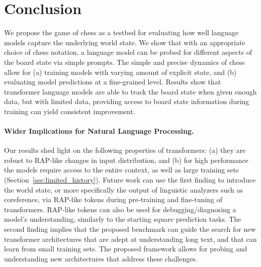 \section{Conclusion}
We propose the game of chess as a testbed for evaluating how well language models capture the underlying world state. 
We show that with an appropriate choice of chess notation, a language model can be probed for different aspects of the board state via simple prompts.
The simple and precise dynamics of chess allow for (a) training models with varying amount of explicit state, and (b) evaluating 
model predictions at a fine-grained level.
Results show that transformer language models are able to track the board state when given enough
data, but with limited data, %
providing access to board state information during training can yield consistent improvement. 

 \paragraph{Wider Implications for Natural Language Processing.}
Our results shed light on the following properties of transformers: (a) they are robust to RAP-like changes in input distribution, and (b) for high performance the models require access to the entire context, as well as large training sets (Section~\ref{sec:limited_history}). 
Future work can use the first finding to introduce the world state, or more specifically the output of linguistic analyzers such as coreference,  via RAP-like tokens during pre-training and fine-tuning of transformers. 
RAP-like tokens can also be used for debugging/diagnosing a model's understanding, similarly to the starting square prediction tasks. 
The second finding implies that the proposed benchmark can guide the search for new transformer architectures that are adept at understanding long text, and that can learn from small training sets.  
The proposed framework allows for probing and understanding new architectures that address these challenges.   

